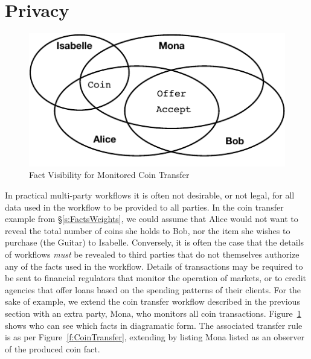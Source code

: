 




\section{Privacy}
\label{s:Privacy}

\begin{figure}
\begin{center}
\includegraphics{figure/coin-transfer-visibility.pdf}
\end{center}
\vspace{-2ex}
\caption{Fact Visibility for Monitored Coin Transfer}
\label{f:CoinTransferVisibility}
\end{figure}

In practical multi-party workflows it is often not desirable, or not legal, for all data used in the workflow to be provided to all parties. In the coin transfer example from \S\ref{s:FactsWeights}, we could assume that Alice would not want to reveal the total number of coins she holds to Bob, nor the item she wishes to purchase (the Guitar) to Isabelle. Conversely, it is often the case that the details of workflows \emph{must} be revealed to third parties that do not themselves authorize any of the facts used in the workflow. Details of transactions may be required to be sent to financial regulators that monitor the operation of markets, or to credit agencies that offer loans based on the spending patterns of their clients. For the sake of example, we extend the coin transfer workflow described in the previous section with an extra party, Mona, who monitors all coin transactions. Figure~\ref{f:CoinTransferVisibility} shows who can see which facts in diagramatic form. The associated transfer rule is as per Figure~\ref{f:CoinTransfer}, extending by listing Mona listed as an observer of the produced coin fact.

